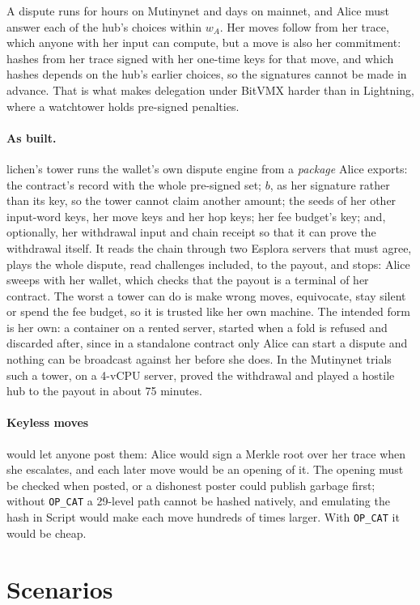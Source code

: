 \documentclass[11pt]{article}
\begin{document}
A dispute runs for hours on Mutinynet and days on mainnet, and Alice
must answer each of the hub's choices within $w_A$. Her moves follow
from her trace, which anyone with her input can compute, but a move is
also her commitment: hashes from her trace signed with her one-time keys
for that move, and which hashes depends on the hub's earlier choices, so
the signatures cannot be made in advance. That is what makes delegation
under BitVMX harder than in Lightning, where a watchtower holds
pre-signed penalties.

\paragraph{As built.} lichen's tower runs the wallet's own dispute
engine from a \emph{package} Alice exports: the contract's record with
the whole pre-signed set; $b$, as her signature rather than its key, so
the tower cannot claim another amount; the seeds of her other input-word
keys, her move keys and her hop keys; her fee budget's key; and,
optionally, her withdrawal input and chain receipt so that it can prove
the withdrawal itself. It reads the chain through two Esplora servers
that must agree, plays the whole dispute, read challenges included, to
the payout, and stops: Alice sweeps with her wallet, which checks that
the payout is a terminal of her contract. The worst a tower can do is
make wrong moves, equivocate, stay silent or spend the fee budget, so it
is trusted like her own machine. The intended form is her own: a
container on a rented server, started when a fold is refused and
discarded after, since in a standalone contract only Alice can start a
dispute and nothing can be broadcast against her before she does. In
the Mutinynet trials such a tower, on a 4-vCPU server, proved the
withdrawal and played a hostile hub to the payout in about 75 minutes.

\paragraph{Keyless moves} would let anyone post them: Alice would sign a
Merkle root over her trace when she escalates, and each later move would
be an opening of it. The opening must be checked when posted, or a
dishonest poster could publish garbage first; without \texttt{OP\_CAT}
a 29-level path cannot be hashed natively, and emulating the hash in
Script would make each move hundreds of times larger. With
\texttt{OP\_CAT} it would be cheap.

\section{Scenarios}
\label{sec:scenarios}
\end{document}
